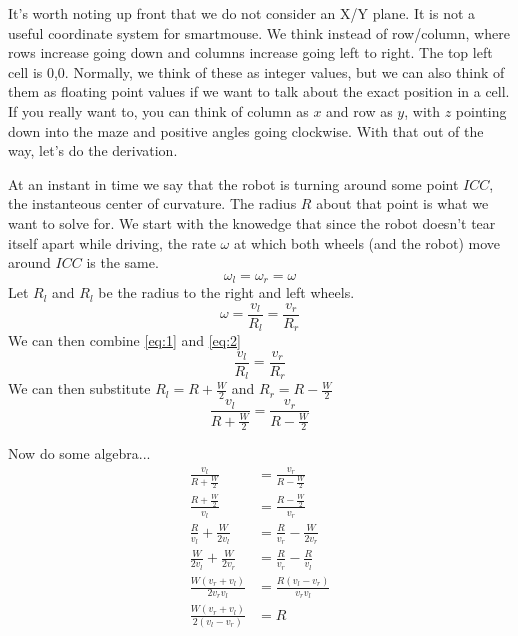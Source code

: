 \documentclass{article}
\begin{document}
It's worth noting up front that we do not consider an X/Y plane. It is not a useful coordinate system for smartmouse. We think instead of row/column, where rows increase going down and columns increase going left to right. The top left cell is 0,0. Normally, we think of these as integer values, but we can also think of them as floating point values if we want to talk about the exact position in a cell. If you really want to, you can think of column as $x$ and row as $y$, with $z$ pointing down into the maze and positive angles going clockwise. With that out of the way, let's do the derivation.

At an instant in time we say that the robot is turning around some point $ICC$, the instanteous center of curvature. The radius $R$ about that point is what we want to solve for. We start with the knowedge that since the robot doesn't tear itself apart while driving, the rate $\omega$ at which both wheels (and the robot) move around $ICC$ is the same.
\begin{equation} \label{eq:1}
  \omega_l = \omega_r = \omega
\end{equation}
Let $R_l$ and $R_l$ be the radius to the right and left wheels.
\begin{equation} \label{eq:2}
  \omega = \frac{v_l}{R_l} = \frac{v_r}{R_r}
\end{equation}
We can then combine \ref{eq:1} and \ref{eq:2}
\begin{equation}
  \frac{v_l}{R_l} = \frac{v_r}{R_r}
\end{equation}
We can then substitute $R_l = R + \frac{W}{2}$ and $R_r = R - \frac{W}{2}$
\begin{equation}
  \frac{v_l}{R+\frac{W}{2}} = \frac{v_r}{R-\frac{W}{2}}
\end{equation}

Now do some algebra...
\begin{align*}
  \frac{v_l}{R+\frac{W}{2}} &= \frac{v_r}{R-\frac{W}{2}} \\[1em]
  \frac{R+\frac{W}{2}}{v_l} &= \frac{R-\frac{W}{2}}{v_r} \\[1em]
  \frac{R}{v_l}+\frac{W}{2v_l} &= \frac{R}{v_r}-\frac{W}{2v_r} \\[1em]
  \frac{W}{2v_l} + \frac{W}{2v_r} &= \frac{R}{v_r} - \frac{R}{v_l} \\[1em]
  \frac{W(v_r + v_l)}{2v_rv_l} &= \frac{R(v_l - v_r)}{v_rv_l} \\[1em]
  \frac{W(v_r + v_l)}{2(v_l - v_r)} &= R
\end{align*}
\end{document}
